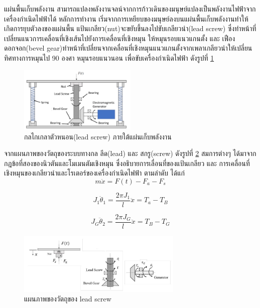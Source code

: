 \documentclass[11pt,a4paper]{article}
\begin{document}
แผ่นพื้นเก็บพลังงาน สามารถแปลงพลังงานจลน์จากการก้าวเดินของมนุษย์แปลงเป็นพลังงานไฟฟ้าจากเครื่องกำเนิดไฟฟ้าได้
หลักการทำงาน เริ่มจากการเหยียบของมนุษย์ลงบนแผ่นพื้นเก็บพลังงานทำให้เกิดการยุบตัวลงของแผ่นพื้น แป้นเกลียว(nut)จะขยับขึ้นลงไปขับเกลียวนำ(lead screw) ซึ่งทำหน้าที่เปลี่ยนแนวการเคลื่อนที่เชิงเส้นไปยังการเคลื่อนที่เชิงหมุน
ให้หมุนรอบแนวแกนตั้ง และ เฟืองดอกจอก(bevel gear)ทำหน้าที่เปลี่ยนจากเคลื่อนที่เชิงหมุนแนวแกนตั้งจากเพลาเกลียวนำให้เปลี่ยนทิศทางการหมุนไป 90 องศา หมุนรอบแนวนอน เพื่อขับเครื่องกำเนิดไฟฟ้า ดังรูปที่ \ref{lead-screw_lx}

\begin{figure}[h!]
    \begin{center}
        \includegraphics[width=0.5\textwidth]{lead-screw_lx.png}
    \end{center}
    \caption{กลไกเกลาตัวหนอน(lead screw) ภายใต้แผ่นเก็บพลังงาน}
    \label{lead-screw_lx}
\end{figure}

จากแผนภาพของวัตถุของระบบทางกล ลีด(lead) และ สกรู(screw) ดังรูปที่ \ref{free_body_lx} สมการต่างๆ ได้มาจากกฎข้อที่สองของนิวตันและโมเมนตัมเชิงหมุน ซึ่งอธิบายการเลื่อนที่ของแป้นเกลียว และ การเคลื่อนที่เชิงหมุนของเกลียวนำและโรเตอร์ของเครื่องกำเนิดไฟฟ้า ตามลำดับ ได้แก่
\newpage
\begin{equation}
    m\ddot{x} = F(t)-F_{a}-F_{s}
\end{equation}

\begin{equation}
    J_{1}\ddot{\theta}_{1} = \frac{2\pi J_{1}}{l}\ddot{x} = T_{a}-T_{B}
\end{equation}

\begin{equation}
    J_{G}\ddot{\theta}_{2} = \frac{2\pi J_{G}}{l}\ddot{x} = T_{B}-T_{G}
\end{equation}

\begin{figure}[h!]
    \begin{center}
        \includegraphics[width=0.7\textwidth]{free_body_lx.png}
    \end{center}
    \caption{แผนภาพของวัตถุของ lead screw}
    \label{free_body_lx}
\end{figure}
\end{document}
